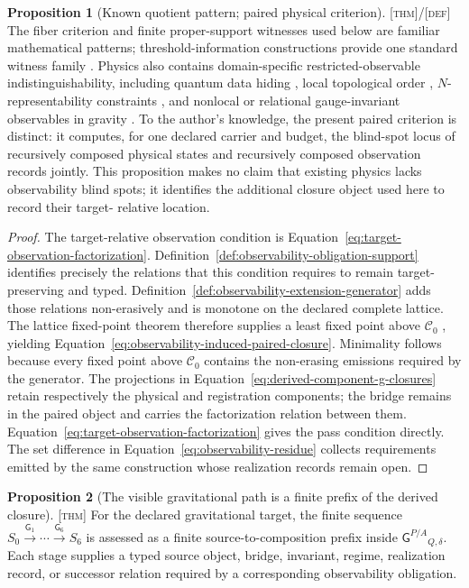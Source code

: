 \documentclass[11pt]{article}
\newcommand{\GOp}{\ensuremath{\mathsf{G}}}
\newcommand{\GPair}{\ensuremath{\mathsf{G}^{P/A}}}
\newcommand{\Defn}{\textsc{[def]}}
\newcommand{\Thm}{\textsc{[thm]}}
\theoremstyle{definition}
\newtheorem{sproposition}{Proposition}
\begin{document}
\begin{sproposition}[Known quotient pattern; paired physical criterion]
\label{prop:known-pattern-paired-criterion}
\Thm{}/\Defn{} The fiber criterion and finite proper-support witnesses used below
are familiar mathematical patterns; threshold-information constructions provide one
standard witness family \cite{S_Shamir1979}. Physics also contains domain-specific
restricted-observable indistinguishability, including quantum data hiding
\cite{S_TerhalDiVincenzoLeung2001}, local topological order
\cite{S_BravyiHastingsMichalakis2010}, $N$-representability constraints
\cite{S_LiuChristandlVerstraete2007}, and nonlocal or relational
 gauge-invariant observables in gravity \cite{S_Giddings2005,S_Khavkine2015}.
To the author's knowledge, the present paired criterion is distinct: it computes,
for one declared carrier and budget, the blind-spot locus of recursively composed
physical states and recursively composed observation records jointly. This
proposition makes no claim that existing physics lacks observability blind spots;
it identifies the additional closure object used here to record their target-
relative location.
\end{sproposition}

\begin{proof}
The target-relative observation condition is Equation~\eqref{eq:target-observation-factorization}.
Definition~\ref{def:observability-obligation-support} identifies precisely the
relations that this condition requires to remain target-preserving and typed.
Definition~\ref{def:observability-extension-generator} adds those relations
non-erasively and is monotone on the declared complete lattice. The lattice
fixed-point theorem therefore supplies a least fixed point above $\mathcal C_0$
\cite{S_Tarski1955}, yielding Equation~\eqref{eq:observability-induced-paired-closure}.
Minimality follows because every fixed point above $\mathcal C_0$ contains the
non-erasing emissions required by the generator. The projections in
Equation~\eqref{eq:derived-component-g-closures} retain respectively the physical
and registration components; the bridge remains in the paired object and carries
the factorization relation between them. Equation~\eqref{eq:target-observation-factorization}
gives the pass condition directly. The set difference in
Equation~\eqref{eq:observability-residue} collects requirements emitted by the
same construction whose realization records remain open.
\end{proof}

\begin{sproposition}[The visible gravitational path is a finite prefix of the derived closure]
\label{prop:visible-path-prefix-derived-closure}
\Thm{} For the declared gravitational target, the finite sequence
$S_0\xrightarrow{\GOp_1}\cdots\xrightarrow{\GOp_6}S_6$ is assessed as a finite
source-to-composition prefix inside $\GPair_{Q,\delta}$. Each stage supplies a
typed source object, bridge, invariant, regime, realization record, or successor
relation required by a corresponding observability obligation.
\end{sproposition}
\end{document}
